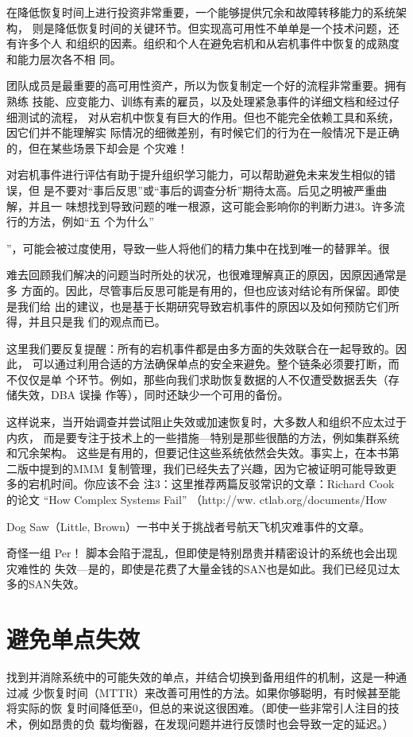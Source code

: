 在降低恢复时间上进行投资非常重要，一个能够提供冗余和故障转移能力的系统架构，
则是降低恢复时间的关键环节。但实现高可用性不单单是一个技术问题，还有许多个人
和组织的因素。组织和个人在避免宕机和从宕机事件中恢复的成熟度和能力层次各不相
同。

团队成员是最重要的高可用性资产，所以为恢复制定一个好的流程非常重要。拥有熟练
技能、应变能力、训练有素的雇员，以及处理紧急事件的详细文档和经过仔细测试的流程，
对从宕机中恢复有巨大的作用。但也不能完全依赖工具和系统，因它们并不能理解实
际情况的细微差别，有时候它们的行为在一般情况下是正确的，但在某些场景下却会是
个灾难！

对宕机事件进行评估有助于提升组织学习能力，可以帮助避免未来发生相似的错误，但
是不要对“事后反思”或“事后的调查分析”期待太高。后见之明被严重曲解，并且一
味想找到导致问题的唯一根源，这可能会影响你的判断力进3。许多流行的方法，例如“五
个为什么”

”，可能会被过度使用，导致一些人将他们的精力集中在找到唯一的替罪羊。很

难去回顾我们解决的问题当时所处的状况，也很难理解真正的原因，因原因通常是多
方面的。因此，尽管事后反思可能是有用的，但也应该对结论有所保留。即使是我们给
出的建议，也是基于长期研究导致宕机事件的原因以及如何预防它们所得，并且只是我
们的观点而已。

这里我们要反复提醒：所有的宕机事件都是由多方面的失效联合在一起导致的。因此，
可以通过利用合适的方法确保单点的安全来避免。整个链条必须要打断，而不仅仅是单
个环节。例如，那些向我们求助恢复数据的人不仅遭受数据丢失（存储失效，DBA 误操
作等），同时还缺少一个可用的备份。

这样说来，当开始调查并尝试阻止失效或加速恢复时，大多数人和组织不应太过于内疚，
而是要专注于技术上的一些措施—特别是那些很酷的方法，例如集群系统和冗余架构。
这些是有用的，但要记住这些系统依然会失效。事实上，在本书第二版中提到的MMM
复制管理，我们已经失去了兴趣，因为它被证明可能导致更多的宕机时间。你应该不会
注3：这里推荐两篇反驳常识的文章：Richard Cook 的论文 “How Complex Systems Fail” （http://ww.
ctlab.org/documents/How%

Dog Saw（Little, Brown）一书中关于挑战者号航天飞机灾难事件的文章。

奇怪一组 Per！ 脚本会陷于混乱，但即使是特别昂贵并精密设计的系统也会出现灾难性的
失效—是的，即使是花费了大量金钱的SAN也是如此。我们已经见过太多的SAN失效。
\section{避免单点失效}
找到并消除系统中的可能失效的单点，并结合切换到备用组件的机制，这是一种通过减
少恢复时间（MTTR）来改善可用性的方法。如果你够聪明，有时候甚至能将实际的恢
复时间降低至0，但总的来说这很困难。（即使一些非常引人注目的技术，例如昂贵的负
载均衡器，在发现问题并进行反馈时也会导致一定的延迟。）

